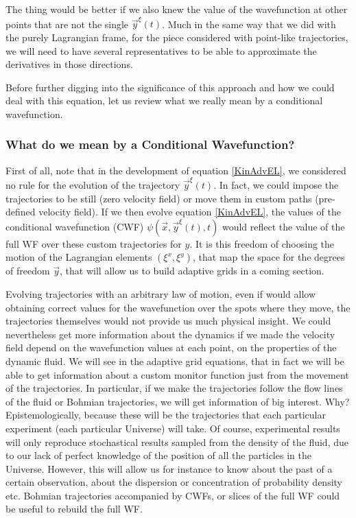 \documentclass[11pt, a4paper]{article} %
\begin{document}
The thing would be better if we also knew the value of the wavefunction at other points that are not the single $\vec{y}^\xi(t)$. Much in the same way that we did with the purely Lagrangian frame, for the piece considered with point-like trajectories, we will need to have several representatives to be able to approximate the derivatives in those directions.

Before further digging into the significance of this approach and how we could deal with this equation, let us review what we really mean by a conditional wavefunction.

\subsubsection*{What do we mean by a Conditional Wavefunction?}
First of all, note that in the development of equation \eqref{KinAdvEL}, we considered no rule for the evolution of the trajectory $\vec{y}^\xi(t)$. In fact, we could impose the trajectories to be still (zero velocity field) or move them in custom paths (pre-defined velocity field). If we then evolve equation \eqref{KinAdvEL}, the values of the conditional wavefunction (CWF) $\psi(\vec{x}, \vec{y}^\xi(t),t)$ would reflect the value of the full WF over these custom trajectories for $y$. It is this freedom of choosing the motion of the Lagrangian elements $(\xi^x,\xi^y)$, that map the space for the degrees of freedom $\vec{y}$, that will allow us to build adaptive grids in a coming section.

Evolving trajectories with an arbitrary law of motion, even if would allow obtaining correct values for the wavefunction over the spots where they move, the trajectories themselves would not provide us much physical insight. We could nevertheless get more information about the dynamics if we made the velocity field depend on the wavefunction values at each point, on the properties of the dynamic fluid. We will see in the adaptive grid equations, that in fact we will be able to get information about a custom monitor function just from the movement of the trajectories. In particular, if we make the trajectories follow the flow lines of the fluid or Bohmian trajectories, we will get information of big interest. Why? Epistemologically, because these will be the trajectories that each particular experiment (each particular Universe) will take. Of course, experimental results will only reproduce stochastical results sampled from the density of the fluid, due to our lack of perfect knowledge of the position of all the particles in the Universe. However, this will allow us for instance to know about the past of a certain observation, about the dispersion or concentration of probability density etc. Bohmian trajectories accompanied by CWFs, or slices of the full WF could be useful to rebuild the full WF.
\end{document}
